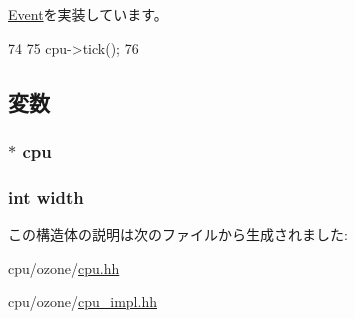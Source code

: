 \hyperlink{classEvent_a142b75b68a6291400e20fb0dd905b1c8}{Event}を実装しています。


\begin{DoxyCode}
74 {
75     cpu->tick();
76 }
\end{DoxyCode}


\subsection{変数}
\hypertarget{structOzoneCPU_1_1TickEvent_a61b5f503eec141308b0cd6b4322b405b}{
\subsubsection[{cpu}]{$\ast$ {\bf cpu}}}
\label{structOzoneCPU_1_1TickEvent_a61b5f503eec141308b0cd6b4322b405b}
\hypertarget{structOzoneCPU_1_1TickEvent_a2474a5474cbff19523a51eb1de01cda4}{
\subsubsection[{width}]{\setlength{\rightskip}{0pt plus 5cm}int {\bf width}}}
\label{structOzoneCPU_1_1TickEvent_a2474a5474cbff19523a51eb1de01cda4}


この構造体の説明は次のファイルから生成されました:\begin{DoxyCompactItemize}
\item 
cpu/ozone/\hyperlink{ozone_2cpu_8hh}{cpu.hh}\item 
cpu/ozone/\hyperlink{ozone_2cpu__impl_8hh}{cpu\_\-impl.hh}\end{DoxyCompactItemize}
